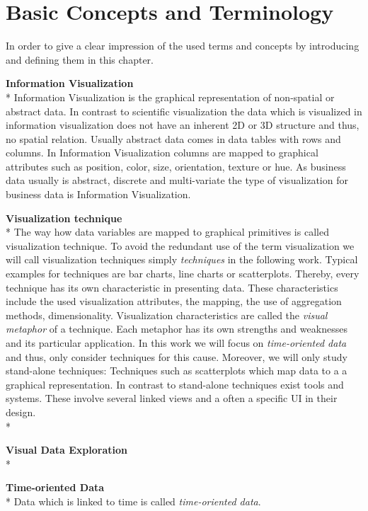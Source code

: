 \chapter{Basic Concepts and Terminology}
\label{concepts}
In order to give a clear impression of the used terms and concepts by introducing and defining them in this chapter.

\textbf{Information Visualization}\\*
Information Visualization is the graphical representation of non-spatial or abstract data\cite{Keim}. In contrast to scientific visualization the data which is visualized in information visualization does not have an inherent 2D or 3D structure\cite{Shneiderman2008} and thus, no spatial relation. Usually abstract data comes in data tables with rows and columns. In Information Visualization columns are mapped to graphical attributes such as position, color, size, orientation, texture or hue. 
As business data usually is abstract, discrete and multi-variate\cite{Tegarden1999} the type of visualization for business data is Information Visualization.

\textbf{Visualization technique}\\*
The way how data variables are mapped to graphical primitives is called visualization technique. To avoid the redundant use of the term visualization we will call visualization techniques simply \textit{techniques} in the following work. Typical examples for techniques are bar charts, line charts or scatterplots. Thereby, every technique has its own characteristic in presenting data. These characteristics include the used visualization attributes, the mapping, the use of aggregation methods, dimensionality. Visualization characteristics are called the \textit{visual metaphor} of a technique\cite{Tegarden1999}. Each metaphor has its own strengths and weaknesses and its particular application. In this work we will focus on \textit{time-oriented data} and thus, only consider techniques for this cause. Moreover, we will only study stand-alone techniques: Techniques such as scatterplots which map data to a a graphical representation. In contrast to stand-alone techniques exist tools and systems. These involve several linked views and a often a specific UI in their design.
\\*

\textbf{Visual Data Exploration}\\*

\textbf{Time-oriented Data}\\*
Data which is linked to time\cite{Aigner2011} is called \textit{time-oriented data}. 




